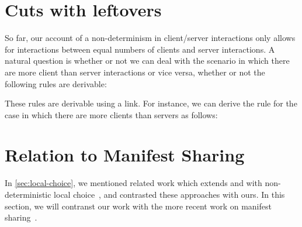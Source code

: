 \documentclass[envcountsame,envcountsect,UKenglish]{llncs}
\begin{document}
\section{Cuts with leftovers}\label{sec:leftovers}
So far, our account of a non-determinism in client/server interactions only allows for interactions between equal numbers of clients and server interactions. A natural question is whether or not we can deal with the scenario in which there are more client than server interactions or vice versa, \ie whether or not the following rules are derivable:
\begin{center}
  \begin{prooftree*}
  \end{prooftree*}
  \begin{prooftree*}
  \end{prooftree*}
\end{center}
These rules are derivable using a link. For instance, we can derive the rule for the case in which there are more clients than servers as follows:
\begin{prooftree}
\end{prooftree}

\section{Relation to Manifest Sharing}
In \cref{sec:local-choice}, we mentioned related work which extends \piDILL and \cp with non-deterministic local choice~\parencite{atkey2016,caires2014,caires2017}, and contrasted these approaches with ours.
In this section, we will contranst our work with the more recent work on manifest sharing~\parencite{balzer2017}.
\end{document}
